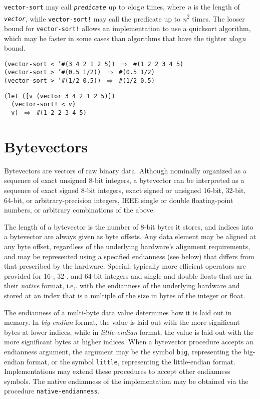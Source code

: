 \texttt{vector-sort} may call \texttt{\textit{predicate}} up to \textit{n}log\textit{n} times,
where \textit{n} is the length of \texttt{\textit{vector}}, while
\texttt{vector-sort!} may call the predicate up to \textit{n}\textsuperscript{2} times.
The looser bound for \texttt{vector-sort!} allows an implementation to
use a quicksort algorithm, which may be faster in some cases than
algorithms that have the tighter \textit{n}log\textit{n} bound.

\begin{alltt}
(vector-sort \textless{} '\#{}(3 4 2 1 2 5)) \(\Rightarrow\) \#{}(1 2 2 3 4 5)
(vector-sort \textgreater{} '\#{}(0.5 1/2)) \(\Rightarrow\) \#{}(0.5 1/2)
(vector-sort \textgreater{} '\#{}(1/2 0.5)) \(\Rightarrow\) \#{}(1/2 0.5)

(let ([v (vector 3 4 2 1 2 5)])
  (vector-sort! \textless{} v)
  v) \(\Rightarrow\) \#{}(1 2 2 3 4 5)
\end{alltt}

\section{\label{objects_g116}\label{objects_h10}Bytevectors\label{objects_SECTBYTEVECTORS}}



Bytevectors are vectors of raw binary data.
Although nominally organized as a sequence of exact unsigned 8-bit integers, a
bytevector can be interpreted as a sequence of exact signed 8-bit integers,
exact signed or unsigned 16-bit, 32-bit, 64-bit, or arbitrary-precision
integers, IEEE single or double floating-point numbers, or arbitrary
combinations of the above.


The length of a bytevector is the number of 8-bit bytes it stores,
and indices into a bytevector are always given as byte offsets.
Any data element may be aligned at any byte offset, regardless of the
underlying hardware's alignment requirements, and may be represented using
a specified endianness (see below) that differs from that prescribed
by the hardware.
Special, typically more efficient operators are provided for
16-, 32-, and 64-bit integers and single and double floats that are
in their \textit{native} format, i.e,. with the endianness of
the underlying hardware and stored at an index that is a multiple of
the size in bytes of the integer or float.


The endianness of a multi-byte data value determines how it is laid
out in memory.
In \textit{big-endian} format, the value is laid out with the more
significant bytes at lower indices, while in \textit{little-endian} format,
the value is laid out with the more significant bytes at higher
indices.
When a bytevector procedure accepts an endianness argument, the argument
may be the symbol \texttt{big}, representing the big-endian format, or the
symbol \texttt{little}, representing the little-endian format.
Implementations may extend these procedures to accept other endianness
symbols.
The native endianness of the implementation may be obtained via
the procedure \texttt{native-endianness}.


